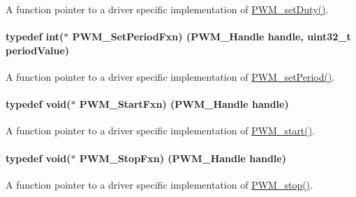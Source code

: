 A function pointer to a driver specific implementation of \hyperlink{_p_w_m_8h_a90979a3b8d525f266c2b82e012f68cee}{P\+W\+M\+\_\+set\+Duty()}. 

\paragraph[{P\+W\+M\+\_\+\+Set\+Period\+Fxn}]{\setlength{\rightskip}{0pt plus 5cm}typedef int($\ast$ P\+W\+M\+\_\+\+Set\+Period\+Fxn) ({\bf P\+W\+M\+\_\+\+Handle} handle, uint32\+\_\+t period\+Value)}\label{_p_w_m_8h_a11f62a9fd14169856c477ce2fbe17b6f}


A function pointer to a driver specific implementation of \hyperlink{_p_w_m_8h_ae40714354f46dd6d30dbfb14473c73e0}{P\+W\+M\+\_\+set\+Period()}. 

\paragraph[{P\+W\+M\+\_\+\+Start\+Fxn}]{\setlength{\rightskip}{0pt plus 5cm}typedef void($\ast$ P\+W\+M\+\_\+\+Start\+Fxn) ({\bf P\+W\+M\+\_\+\+Handle} handle)}\label{_p_w_m_8h_af0a392fb66c104f9d60e80e023dd3b89}


A function pointer to a driver specific implementation of \hyperlink{_p_w_m_8h_aa1bd0cc3f0fa52879422fca74d254378}{P\+W\+M\+\_\+start()}. 

\paragraph[{P\+W\+M\+\_\+\+Stop\+Fxn}]{\setlength{\rightskip}{0pt plus 5cm}typedef void($\ast$ P\+W\+M\+\_\+\+Stop\+Fxn) ({\bf P\+W\+M\+\_\+\+Handle} handle)}\label{_p_w_m_8h_aff8ad682f40a810ecf03824e8e190087}


A function pointer to a driver specific implementation of \hyperlink{_p_w_m_8h_ae83a4cd327a07d6037ff1a8d72fb3ae6}{P\+W\+M\+\_\+stop()}. 

